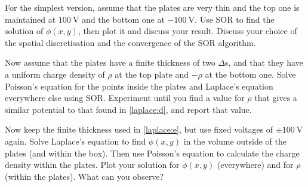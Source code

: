 \documentclass{../project}
\begin{document}
\begin{sheet}[title={Project 4: Partial differential equations (PDEs)}, number=4, due={December 20th, 10am}]
\begin{problem}[title={Laplace equation}, label=laplace]
  \begin{subproblem}[label=laplace:d,points=4]
    For the simplest version,
    assume that the plates are very thin
    and the top one is maintained at $\SI{100}{\volt}$
    and the bottom one at $\SI{-100}{\volt}$.
    Use SOR to find the solution of $\phi(x,y)$,
    then plot it and discuss your result.
    Discuss your choice of the spatial discretisation
    and the convergence of the SOR algorithm.
  \end{subproblem}

  \begin{subproblem}[label=laplace:e,points=4]
    Now assume that the plates have a finite thickness
    of two $\Delta$s,
    and that they have a uniform charge density of
    $\rho$ at the top plate and 
    $-\rho$ at the bottom one.
    Solve Poisson's equation for the points inside the plates
    and Laplace's equation everywhere else using SOR.
    Experiment until you find a value for $\rho$ that gives
    a similar potential to that found in \ref{laplace:d},
    and report that value.
  \end{subproblem}

  \begin{subproblem}[label=laplace:f,points=4]
    Now keep the finite thickness used in \ref{laplace:e},
    but use fixed voltages of $\pm\SI{100}{\volt}$ again.
    Solve Laplace's equation to find $\phi(x,y)$ in the volume
    outside of the plates (and within the box).
    Then use Poisson's equation
    to calculate the charge density within the plates.
    Plot your solution for $\phi(x,y)$ (everywhere) and for $\rho$ (within the plates).
    What can you observe?
  \end{subproblem}

  \fi

\end{problem}

\clearpage
\begin{problem}[title={Diffusion}, label=diffusion]

 
\tikzset{
pattern size/.store in=\mcSize, 
pattern size = 5pt,
pattern thickness/.store in=\mcThickness, 
pattern thickness = 0.3pt,
pattern radius/.store in=\mcRadius, 
pattern radius = 1pt}
\makeatletter
{}
\makeatother


\end{problem}
\end{sheet}
\end{document}
